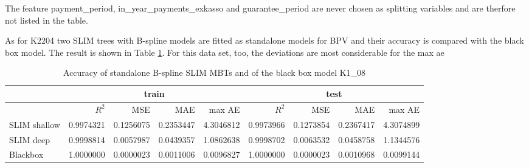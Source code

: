 The feature payment\_period, in\_year\_payments\_exkasso and guarantee\_period are never chosen as splitting variables and are therfore not listed in the table.


As for K2204 two SLIM trees with B-spline models are fitted as  standalone models for BPV and their accuracy is compared with the black box model. The result is shown in Table \ref{tab:ins_k108_standalone_slim}. For this data set, too, the deviations are most considerable for the max ae





\begin{table}[!htb]

\caption{Accuracy of standalone B-spline SLIM MBTs and of the black box model K1\_08}
\centering \scriptsize  
\begin{tabular}[t]{l|r|r|r|r|r|r|r|r}
\hline
 & \multicolumn{4}{|c|}{train} & \multicolumn{4}{|c}{test} \\
\hline
 & $R^2$ & MSE & MAE & max AE & $R^2$ & MSE & MAE & max AE \\
\hline
SLIM shallow & 0.9974321 & 0.1256075 & 0.2353447 & 4.3046812 & 0.9973966 & 0.1273854 & 0.2367417 & 4.3074899\\
SLIM deep & 0.9998814 & 0.0057987 & 0.0439357 & 1.0862638 & 0.9998702 & 0.0063532 & 0.0458758 & 1.1344576\\
Blackbox & 1.0000000 & 0.0000023 & 0.0011006 & 0.0096827 & 1.0000000 & 0.0000023 & 0.0010968 & 0.0099144\\
\hline
\end{tabular}
\label{tab:ins_k108_standalone_slim}
\end{table}